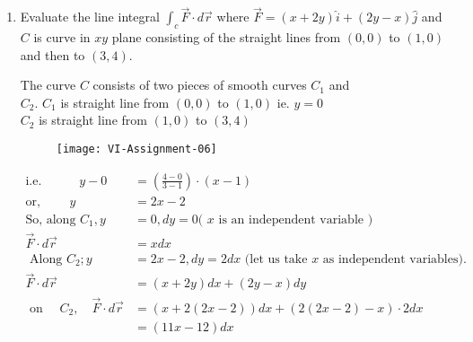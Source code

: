 \begin{enumerate}
\begin{answer}
\begin{align*}
		\intertext{On curve $C$, let us take $x$ as indepedent variable. The dependent variable $y$ can be written in terms of $x$ as}
		 y &=x^{2}-1 \\ d y &=2 x d x 
		 \intertext{work done is moving a particle by displacement $d \vec{r}$}
		  d W &=\vec{F} \cdot d \vec{r} \\ &=x y d x+\left(x^{2}+y^{2}\right) d y \\ &=x\left(x^{2}-1\right) d x+\left(x^{2}+\left(x^{2}-1\right)^{2}\right) 2 x d x \\ &=\left(2 x^{5}-x^{3}+x\right) d x 
		  \intertext{So, work done is moving a particle from $(1,0)$ to $(3,8)$ along a curve $C$.}
		   W &=\int_{c} \vec{F} \cdot d \vec{r}=\int_{1}^{3}\left(2 x^{5}-x^{3}+x\right) d x \\ &=\left.\left(2 \cdot \frac{x^{6}}{6}-\frac{x^{4}}{4}+\frac{x^{2}}{2}\right)\right|_{1} ^{3}=227 
		\end{align*}
	\end{answer}
	\item Evaluate the line integral $\int_{c} \vec{F} \cdot d \vec{r}$ where $\vec{F}=(x+2 y) \hat{i}+(2 y-x) \hat{j}$ and $C$ is curve in $x y$ plane consisting of the straight lines from $(0,0)$ to $(1,0)$ and then to $(3,4)$.
	\begin{answer}
		The curve $C$ consists of two pieces of smooth curves $C_{1}$ and\\ $C_{2}$. $C_{1}$ is straight line from $(0,0)$ to $(1,0)$ ie. $y=0$\\
		$C_{2}$ is straight line from $(1,0)$ to $(3,4)$
		\begin{figure}[H]
			\centering
			\texttt{[image: VI-Assignment-06]}
		\end{figure}
		\begin{align*}
		\text{i.e}.\qquad \quad y-0&=\left(\frac{4-0}{3-1}\right) \cdot(x-1)\\
		\text{or, }\qquad y&=2 x-2\\
		\text{So, along }C_{1}, y&=0, d y=0 \text{( $x$ is an independent variable )}\\
		\vec{F} \cdot d \vec{r}&=x d x\\
	\text{	Along }C_{2} ; y&=2 x-2, d y=2 d x\text{ (let us take $x$ as independent variables).}\\
		\vec{F} \cdot d \vec{r}&=(x+2 y) d x+(2 y-x) d y\\
	\text{	on }\quad C_{2}, \quad \vec{F} \cdot d \vec{r} &=(x+2(2 x-2)) d x+(2(2 x-2)-x) \cdot 2 d x \\ &=(11 x-12) d x \\

\end{align*}
\end{answer}
\end{enumerate}
